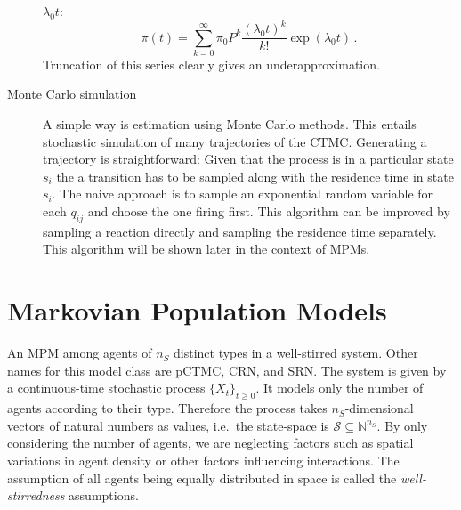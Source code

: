 \begin{description}
        $\lambda_0 t$:
        \[
        \pi(t) =
        \sum_{k=0}^{\infty}\pi_0P^k\frac{(\lambda_0 t)^k}{k!} \exp{(\lambda_0 t)}\,.
    \]
        Truncation of this series clearly gives an underapproximation.
    \item[Monte Carlo simulation]
        A simple way is estimation using Monte Carlo methods. This entails stochastic
        simulation of many trajectories of the \ac{CTMC}\@\@. Generating a trajectory is
        straightforward: Given that the process is in a particular state $s_i$
        the a transition has to be sampled along with the residence time in state
        $s_i$. The naive approach is to sample an exponential random variable for
        each $q_{ij}$ and choose the one firing first.
        This algorithm can be improved by sampling a reaction directly and
        sampling the residence time separately. This algorithm will be shown later
        in the context of \acp{MPM}\@.
\end{description}

\section{Markovian Population Models}
An \acf{MPM}
among agents of $n_S$ distinct types in a well-stirred system.
Other names for this model class are \acf{pCTMC}, \acf{CRN}, and \acf{SRN}\@.
The system is given by a continuous-time stochastic process $\{X_t\}_{t\geq 0}$.
It models only the number of agents according to their type.
Therefore the process takes $n_S$-dimensional vectors of natural numbers as values, i.e.\ the
state-space is $\mathcal{S}\subseteq\mathbb{N}^{n_S}$.
By only considering the number of agents, we are neglecting factors such as spatial variations
in agent density or other factors influencing interactions.
The assumption of all agents being equally distributed in space is called the \emph{well-stirredness}
assumptions.

